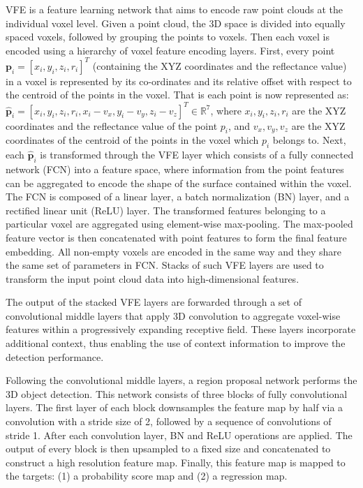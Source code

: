 \documentclass[letterpaper, 10 pt, conference]{ieeeconf}
\begin{document}
VFE is a feature learning network that aims to encode raw point clouds at the individual voxel level. Given a point cloud, the 3D space is divided into equally spaced voxels, followed by grouping the points to voxels. Then each voxel is encoded using a hierarchy of voxel feature encoding layers. First, every point $\mathbf{p}_i=[x_i, y_i, z_i, r_i]^{T}$ (containing the XYZ coordinates and the reflectance value) in a voxel is represented by its co-ordinates and its relative offset with respect to the centroid of the points in the voxel. That is each point is now represented as: $ \hat{\mathbf{p}}_i=[x_i, y_i, z_i, r_i, x_i-v_x, y_i-v_y, z_i-v_z]^{T} \in \mathbb{R}^7$, where $x_i, y_i, z_i, r_i$ are the XYZ coordinates and the reflectance value of the point $p_i$, and $v_x, v_y, v_z$ are the XYZ coordinates of the centroid of the points in the voxel which $p_i$ belongs to. Next, each $\hat{\mathbf{p}}_i$ is transformed through the VFE layer which consists of a fully connected network (FCN) into a feature space, where information from the point features can be aggregated to encode the shape of the surface contained within the voxel. The FCN is composed of a linear layer, a batch normalization (BN) layer, and a rectified linear unit (ReLU) layer. The transformed features belonging to a particular voxel are aggregated using element-wise max-pooling. The max-pooled feature vector is then concatenated with point features to form the final feature embedding. All non-empty voxels are encoded in the same way and they share the same set of parameters in FCN. Stacks of such VFE layers are used to transform the input point cloud data into high-dimensional features. 

The output of the stacked VFE layers are forwarded through a set of convolutional middle layers that apply 3D convolution to aggregate voxel-wise features within a progressively expanding receptive field. These layers incorporate additional context, thus enabling the use of context information to improve the detection performance. 


Following the convolutional middle layers, a region proposal network \cite{girshick2015fast} performs the 3D object detection. This network consists of three blocks of fully convolutional layers. The first layer of each block downsamples the feature map by half via a convolution with a stride size of 2, followed by a sequence of convolutions of stride 1. After each convolution layer, BN and ReLU operations are applied. The output of every block is then upsampled to a fixed size and concatenated to construct a high resolution feature map. Finally, this feature map is mapped to the targets: (1) a probability score map and (2) a regression map. 
\end{document}
